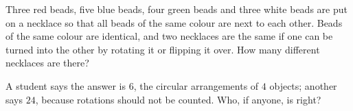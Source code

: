 Three red beads, five blue beads, four green beads and three white beads are put on a necklace so that all beads of the same colour are next to each other. Beads of the same colour are identical, and two necklaces are the same if one can be turned into the other by rotating it or flipping it over. How many different necklaces are there?

A student says the answer is $6$, the circular arrangements of $4$ objects; another says $24$, because rotations should not be counted. Who, if anyone, is right?

